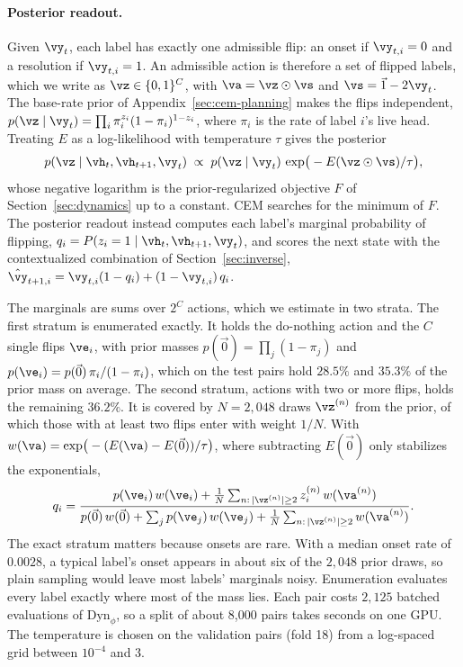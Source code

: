 \paragraph{Posterior readout.} Given $\vy_t$, each label has exactly one admissible flip: an onset if $\vy_{t,i}=0$ and a resolution if $\vy_{t,i}=1$. An admissible action is therefore a set of flipped labels, which we write as $\vz\in\{0,1\}^C$, with $\va=\vz\odot\vs$ and $\vs=\vec 1-2\vy_t$. The base-rate prior of Appendix~\ref{sec:cem-planning} makes the flips independent, $p(\vz\mid\vy_t)=\prod_i\pi_i^{z_i}(1-\pi_i)^{1-z_i}$, where $\pi_i$ is the rate of label $i$'s live head. Treating $E$ as a log-likelihood with temperature $\tau$ gives the posterior
$$ p(\vz\mid\vh_t,\vh_{t+1},\vy_t)\;\propto\;p(\vz\mid\vy_t)\,\exp\!\big(-E(\vz\odot\vs)/\tau\big), $$
whose negative logarithm is the prior-regularized objective $F$ of Section~\ref{sec:dynamics} up to a constant. CEM searches for the minimum of $F$. The posterior readout instead computes each label's marginal probability of flipping, $q_i=P(z_i=1\mid\vh_t,\vh_{t+1},\vy_t)$, and scores the next state with the contextualized combination of Section~\ref{sec:inverse}, $\hat{\vy}_{t+1,i}=\vy_{t,i}(1-q_i)+(1-\vy_{t,i})\,q_i$.

The marginals are sums over $2^C$ actions, which we estimate in two strata. The first stratum is enumerated exactly. It holds the do-nothing action and the $C$ single flips $\ve_i$, with prior masses $p(\vec 0)=\prod_j(1-\pi_j)$ and $p(\ve_i)=p(\vec 0)\,\pi_i/(1-\pi_i)$, which on the test pairs hold $28.5\%$ and $35.3\%$ of the prior mass on average. The second stratum, actions with two or more flips, holds the remaining $36.2\%$. It is covered by $N=2{,}048$ draws $\vz^{(n)}$ from the prior, of which those with at least two flips enter with weight $1/N$. With $w(\va)=\exp\!\big(-(E(\va)-E(\vec 0))/\tau\big)$, where subtracting $E(\vec 0)$ only stabilizes the exponentials,
$$ q_i=\frac{p(\ve_i)\,w(\ve_i)+\frac1N\sum_{n:\,|\vz^{(n)}|\ge2} z^{(n)}_i\,w(\va^{(n)})}{p(\vec 0)\,w(\vec 0)+\sum_j p(\ve_j)\,w(\ve_j)+\frac1N\sum_{n:\,|\vz^{(n)}|\ge2} w(\va^{(n)})}. $$
The exact stratum matters because onsets are rare. With a median onset rate of $0.0028$, a typical label's onset appears in about six of the $2{,}048$ prior draws, so plain sampling would leave most labels' marginals noisy. Enumeration evaluates every label exactly where most of the mass lies. Each pair costs $2{,}125$ batched evaluations of $\text{Dyn}_\phi$, so a split of about 8{,}000 pairs takes seconds on one GPU. The temperature is chosen on the validation pairs (fold 18) from a log-spaced grid between $10^{-4}$ and $3$.

